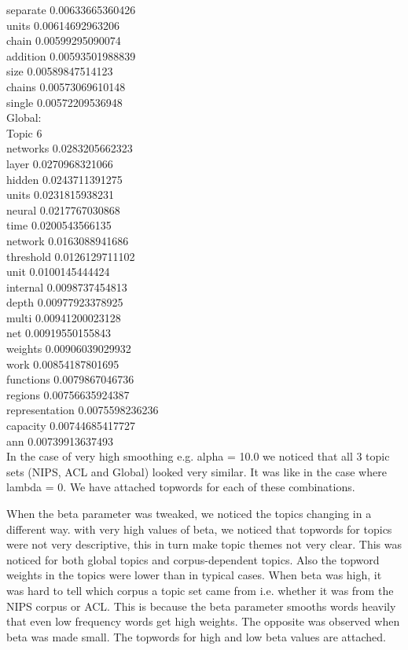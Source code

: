\documentclass{article}
\begin{document}
{separate 0.00633665360426\\
units 0.00614692963206\\
chain 0.00599295090074\\
addition 0.00593501988839\\
size 0.00589847514123\\
chains 0.00573069610148\\
single 0.00572209536948\\
Global:\\
Topic 6\\
networks 0.0283205662323\\
layer 0.0270968321066\\
hidden 0.0243711391275\\
units 0.0231815938231\\
neural 0.0217767030868\\
time 0.0200543566135\\
network 0.0163088941686\\
threshold 0.0126129711102\\
unit 0.0100145444424\\
internal 0.0098737454813\\
depth 0.00977923378925\\
multi 0.00941200023128\\
net 0.00919550155843\\
weights 0.00906039029932\\
work 0.00854187801695\\
functions 0.0079867046736\\
regions 0.00756635924387\\
representation 0.0075598236236\\
capacity 0.00744685417727\\
ann 0.00739913637493\\

In the case of very high smoothing e.g. alpha = 10.0 we noticed that all 3 topic sets (NIPS, ACL and Global) looked very similar. It was like in the case where lambda = 0.
We have attached topwords for each of these combinations.

When the beta parameter was tweaked, we noticed the topics changing in a different way. with very high values of beta, we noticed that topwords for topics were not very descriptive, this in turn make topic themes not very clear. This was noticed for both global topics and corpus-dependent topics. Also the topword weights in the topics were lower than in typical cases. When beta was high, it was hard to tell which corpus a topic set came from i.e. whether it was from the NIPS corpus or ACL. This is because the beta parameter smooths words heavily that even low frequency words get high weights. The opposite was observed when beta was made small. The topwords for high and low beta values are attached.

}
\end{document}
